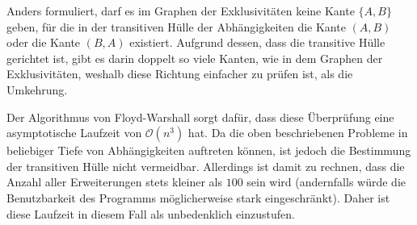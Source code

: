 Anders formuliert, darf es im Graphen der Exklusivitäten keine Kante $\{A, B\}$ geben, für die in der transitiven Hülle der Abhängigkeiten die Kante $(A, B)$ oder die Kante $(B, A)$ existiert. Aufgrund dessen, dass die transitive Hülle gerichtet ist, gibt es darin doppelt so viele Kanten, wie in dem Graphen der Exklusivitäten, weshalb diese Richtung einfacher zu prüfen ist, als die Umkehrung.

Der Algorithmus von Floyd-Warshall sorgt dafür, dass diese Überprüfung eine asymptotische Laufzeit von $\mathcal{O}(n^3)$ hat. Da die oben beschriebenen Probleme in beliebiger Tiefe von Abhängigkeiten auftreten können, ist jedoch die Bestimmung der transitiven Hülle nicht vermeidbar. Allerdings ist damit zu rechnen, dass die Anzahl aller Erweiterungen stets kleiner als $100$ sein wird (andernfalls würde die Benutzbarkeit des Programms möglicherweise stark eingeschränkt). Daher ist diese Laufzeit in diesem Fall als unbedenklich einzustufen.